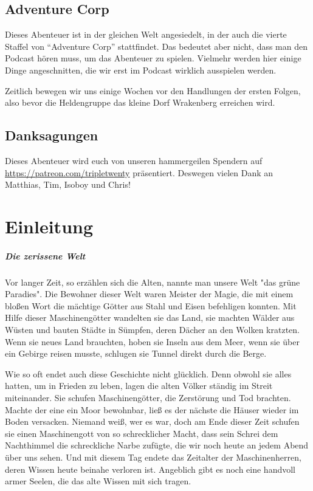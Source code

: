 \section{Adventure Corp}

Dieses Abenteuer ist in der gleichen Welt angesiedelt, in der auch die vierte Staffel von ``Adventure Corp'' stattfindet. Das bedeutet aber nicht, dass man den Podcast hören muss, um das Abenteuer zu spielen. Vielmehr werden hier einige Dinge angeschnitten, die wir erst im Podcast wirklich ausspielen werden.

Zeitlich bewegen wir uns einige Wochen vor den Handlungen der ersten Folgen, also bevor die Heldengruppe das kleine Dorf Wrakenberg erreichen wird.

\section{Danksagungen}

Dieses Abenteuer wird euch von unseren hammergeilen Spendern auf \url{https://patreon.com/tripletwenty} präsentiert. Deswegen vielen Dank an Matthias, Tim, Isoboy und Chris!


\chapter*{Einleitung}

\paragraph{Die zerissene Welt}

Vor langer Zeit, so erzählen sich die Alten, nannte man unsere Welt "das grüne Paradies". Die Bewohner dieser Welt waren Meister der Magie, die mit einem bloßen Wort die mächtige Götter aus Stahl und Eisen befehligen konnten. Mit Hilfe dieser Maschinengötter wandelten sie das Land, sie machten Wälder aus Wüsten und bauten Städte in Sümpfen, deren Dächer an den Wolken kratzten. Wenn sie neues Land brauchten, hoben sie Inseln aus dem Meer, wenn sie über ein Gebirge reisen musste, schlugen sie Tunnel direkt durch die Berge.

Wie so oft endet auch diese Geschichte nicht glücklich. Denn obwohl sie alles hatten, um in Frieden zu leben, lagen die alten Völker ständig im Streit miteinander. Sie schufen Maschinengötter, die Zerstörung und Tod brachten. Machte der eine ein Moor bewohnbar, ließ es der nächste die Häuser wieder im Boden versacken. Niemand weiß, wer es war, doch am Ende dieser Zeit schufen sie einen Maschinengott von so schrecklicher Macht, dass sein Schrei dem Nachthimmel die schreckliche Narbe zufügte, die wir noch heute an jedem Abend über uns sehen. Und mit diesem Tag endete das Zeitalter der Maschinenherren, deren Wissen heute beinahe verloren ist. Angeblich gibt es noch eine handvoll armer Seelen, die das alte Wissen mit sich tragen.

